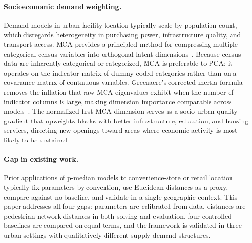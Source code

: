 \paragraph{Socioeconomic demand weighting.}
Demand models in urban facility location typically scale by population count,
which disregards heterogeneity in purchasing power, infrastructure quality,
and transport access.
MCA provides a principled method for compressing multiple categorical census
variables into orthogonal latent dimensions~\cite{greenacre1988correspondence,%
greenacre2006multiple,greenacre2017correspondence}.
Because census data are inherently categorical or categorized, MCA is preferable
to PCA: it operates on the indicator matrix of dummy-coded categories rather
than on a covariance matrix of continuous variables.
Greenacre's corrected-inertia formula removes the inflation that raw MCA
eigenvalues exhibit when the number of indicator columns is large, making
dimension importance comparable across models~\cite{greenacre1991interpreting}.
The normalized first MCA dimension serves as a socio-urban quality gradient
that upweights blocks with better infrastructure, education, and housing
services, directing new openings toward areas where economic activity
is most likely to be sustained.

\paragraph{Gap in existing work.}
Prior applications of \mbox{p-median} models to convenience-store or retail
location typically fix parameters by convention, use Euclidean distances as
a proxy, compare against no baseline, and validate in a single geographic
context.
This paper addresses all four gaps: parameters are calibrated from data,
distances are pedestrian-network distances in both solving and evaluation,
four controlled baselines are compared on equal terms, and the framework
is validated in three urban settings with qualitatively different
supply-demand structures.
